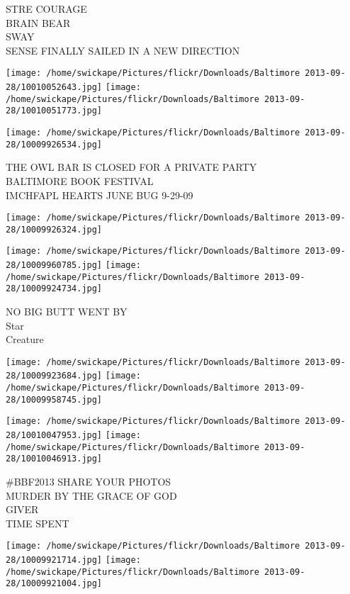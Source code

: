 \documentclass[10pt,letterpaper]{article}
\begin{document}
STRE COURAGE\\
BRAIN BEAR\\
SWAY\\
SENSE FINALLY SAILED IN A NEW DIRECTION\\
\pagebreak

\texttt{[image: /home/swickape/Pictures/flickr/Downloads/Baltimore 2013-09-28/10010052643.jpg]}
\texttt{[image: /home/swickape/Pictures/flickr/Downloads/Baltimore 2013-09-28/10010051773.jpg]}

\vspace{0.25in}
\texttt{[image: /home/swickape/Pictures/flickr/Downloads/Baltimore 2013-09-28/10009926534.jpg]}

THE OWL BAR IS CLOSED FOR A PRIVATE PARTY\\
BALTIMORE BOOK FESTIVAL\\
IMCHFAPL HEARTS JUNE BUG 9{-}29{-}09\\
\pagebreak

\texttt{[image: /home/swickape/Pictures/flickr/Downloads/Baltimore 2013-09-28/10009926324.jpg]}

\vspace{0.25in}
\texttt{[image: /home/swickape/Pictures/flickr/Downloads/Baltimore 2013-09-28/10009960785.jpg]}
\texttt{[image: /home/swickape/Pictures/flickr/Downloads/Baltimore 2013-09-28/10009924734.jpg]}

NO BIG BUTT WENT BY\\
Star\\
Creature\\
\pagebreak

\texttt{[image: /home/swickape/Pictures/flickr/Downloads/Baltimore 2013-09-28/10009923684.jpg]}
\texttt{[image: /home/swickape/Pictures/flickr/Downloads/Baltimore 2013-09-28/10009958745.jpg]}

\texttt{[image: /home/swickape/Pictures/flickr/Downloads/Baltimore 2013-09-28/10010047953.jpg]}
\texttt{[image: /home/swickape/Pictures/flickr/Downloads/Baltimore 2013-09-28/10010046913.jpg]}

\#BBF2013 SHARE YOUR PHOTOS\\
MURDER BY THE GRACE OF GOD\\
GIVER\\
TIME SPENT\\
\pagebreak

\texttt{[image: /home/swickape/Pictures/flickr/Downloads/Baltimore 2013-09-28/10009921714.jpg]}
\texttt{[image: /home/swickape/Pictures/flickr/Downloads/Baltimore 2013-09-28/10009921004.jpg]}
\end{document}
